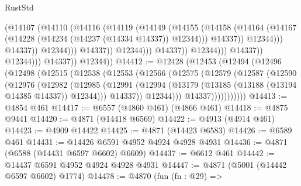 \begin{lexlean}{RustStd}
\begin{coremodule}
{\begin{coremodule}
{{{{{{{{{{{{{{{{{{{{{{{{{{{{{                                              (@14107
                                                (@14110
                                                  (@14116
                                                    (@14119
                                                      (@14149
                                                        (@14155
                                                          (@14158
                                                            (@14164
                                                              (@14167
                                                                (@14228
                                                                  (@14234
                                                                    (@14237 (@14334 @14337))
                                                                    @12344)))
                                                              @14337))
                                                          @12344)))
                                                    @14337))
                                                @12344)))
                                          @14337))
                                      @12344)))
                                @14337))
                            @12344)))
                      @14337))
                  @12344)))
            @14337))
        @12344))
@14412 := @12428
    (@12453
      (@12494
        (@12496
          (@12498
            (@12515
              (@12538
                (@12553
                  (@12566
                    (@12575
                      (@12579
                        (@12587
                          (@12590
                            (@12976
                              (@12982
                                (@12985
                                  (@12991
                                    (@12994
                                      (@13179 (@13185 (@13188 (@13194 @14385 @14337)) @12344)))
                                    @14337))
                                @12344)))
                          @14337)))))))))))
@14413 := @4854 @461
@14417 := @6557 (@4860 @461) (@4866 @461)
@14418 := @4875 @9441
@14420 := @4871 (@14418 @6569)
@14422 := @4913 (@4914 @461)
@14423 := @4909 @14422
@14425 := @4871 (@14423 @6583)
@14426 := @6589 @461
@14431 := @14426 @6591 @4952 @4924 @4928 @4931
@14436 := @4871 (@6588 (@14431 @6597 @6602) @6609)
@14437 := @6612 @461
@14442 := @14437 @6591 @4952 @4924 @4928 @4931
@14447 := @4871 (@5001 (@14442 @6597 @6602) @1774)
@14478 := @4870
    (fun (fn : @29) =>
}}}}}}}}}}}}}}}}}}}}}}}}}}}}}
\end{coremodule}}
\end{coremodule}
\end{lexlean}
